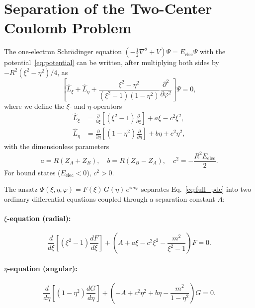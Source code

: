 \documentclass[aps,pra,twocolumn,superscriptaddress,longbibliography]{revtex4-2}
\begin{document}

\section{Separation of the Two-Center Coulomb Problem}
\label{sec:separation}

The one-electron Schr\"odinger equation
$(-\tfrac{1}{2}\nabla^2 + V)\Psi = E_{\mathrm{elec}}\Psi$
with the potential~\eqref{eq:potential} can be written, after
multiplying both sides by $-R^2(\xi^2 - \eta^2)/4$, as
\begin{equation}
  \left[\hat{L}_\xi + \hat{L}_\eta
    + \frac{\xi^2 - \eta^2}{(\xi^2-1)(1-\eta^2)}
      \frac{\partial^2}{\partial\varphi^2}\right]\Psi
  = 0,
  \label{eq:full_pde}
\end{equation}
where we define the $\xi$- and $\eta$-operators
\begin{align}
  \hat{L}_\xi &= \frac{\partial}{\partial\xi}
    \!\left[(\xi^2 - 1)\frac{\partial}{\partial\xi}\right]
    + a\xi - c^2\xi^2, \label{eq:L_xi} \\
  \hat{L}_\eta &= \frac{\partial}{\partial\eta}
    \!\left[(1 - \eta^2)\frac{\partial}{\partial\eta}\right]
    + b\eta + c^2\eta^2, \label{eq:L_eta}
\end{align}
with the dimensionless parameters
\begin{equation}
  a = R(Z_A + Z_B), \quad
  b = R(Z_B - Z_A), \quad
  c^2 = -\frac{R^2 E_{\mathrm{elec}}}{2}.
  \label{eq:params}
\end{equation}
For bound states ($E_{\mathrm{elec}} < 0$), $c^2 > 0$.

The ansatz $\Psi(\xi,\eta,\varphi) = F(\xi)\,G(\eta)\,e^{im\varphi}$
separates Eq.~\eqref{eq:full_pde} into two ordinary differential
equations coupled through a separation constant $A$:

\paragraph{$\xi$-equation (radial):}
\begin{equation}
  \frac{d}{d\xi}\!\left[(\xi^2 - 1)\frac{dF}{d\xi}\right]
  + \left(A + a\xi - c^2\xi^2 - \frac{m^2}{\xi^2 - 1}\right)F = 0.
  \label{eq:xi_equation}
\end{equation}

\paragraph{$\eta$-equation (angular):}
\begin{equation}
  \frac{d}{d\eta}\!\left[(1 - \eta^2)\frac{dG}{d\eta}\right]
  + \left(-A + c^2\eta^2 + b\eta - \frac{m^2}{1 - \eta^2}\right)G = 0.
  \label{eq:eta_equation}
\end{equation}
\end{document}
